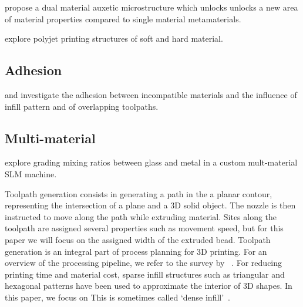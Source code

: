 \cite{Wang2015} propose a dual material auxetic microstructure which unlocks unlocks a new area of material properties compared to single material metamaterials.


\cite{mirzaali2020} explore polyjet printing structures of soft and hard material. %

\subsection{Adhesion}

\cite{fernandez2019} and \citeauthor{tamburrino19} investigate the adhesion between incompatible materials and the influence of infill pattern and of overlapping toolpaths.

\subsection{Multi-material}
\cite{Zhang2020} explore grading mixing ratios between glass and metal in a custom mult-material SLM machine.




\iffalse
Toolpath generation consists in generating a path in the a planar contour, representing the intersection of a plane and a 3D solid object.
The nozzle is then instructed to move along the path while extruding material.
Sites along the toolpath are assigned several properties such as movement speed, but for this paper we will focus on the assigned width of the extruded bead.
Toolpath generation is an integral part of process planning for 3D printing.
For an overview of the processing pipeline, we refer to the survey by \citeauthor{Livesu2017CGF}~\cite{Livesu2017CGF}.
For reducing printing time and material cost, sparse infill structures such as triangular and hexagonal patterns have been used to approximate the interior of 3D shapes.
In this paper, we focus on 
This is sometimes called `dense infill'~\cite{Livesu2017CGF}.

